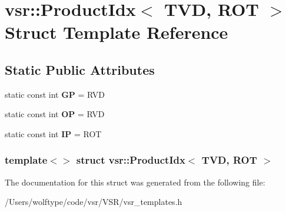 \hypertarget{structvsr_1_1_product_idx_3_01_t_v_d_00_01_r_o_t_01_4}{\section{vsr\-:\-:Product\-Idx$<$ T\-V\-D, R\-O\-T $>$ Struct Template Reference}
\label{structvsr_1_1_product_idx_3_01_t_v_d_00_01_r_o_t_01_4}
}
\subsection*{Static Public Attributes}
\begin{DoxyCompactItemize}
\item 
\hypertarget{structvsr_1_1_product_idx_3_01_t_v_d_00_01_r_o_t_01_4_a747c97039ccc3601b93871951b4f2016}{static const int {\bfseries G\-P} = R\-V\-D}\label{structvsr_1_1_product_idx_3_01_t_v_d_00_01_r_o_t_01_4_a747c97039ccc3601b93871951b4f2016}

\item 
\hypertarget{structvsr_1_1_product_idx_3_01_t_v_d_00_01_r_o_t_01_4_a77c0775794889dae97031d0b06afd0aa}{static const int {\bfseries O\-P} = R\-V\-D}\label{structvsr_1_1_product_idx_3_01_t_v_d_00_01_r_o_t_01_4_a77c0775794889dae97031d0b06afd0aa}

\item 
\hypertarget{structvsr_1_1_product_idx_3_01_t_v_d_00_01_r_o_t_01_4_aa93c15f2567e7874ea78c787628b162a}{static const int {\bfseries I\-P} = R\-O\-T}\label{structvsr_1_1_product_idx_3_01_t_v_d_00_01_r_o_t_01_4_aa93c15f2567e7874ea78c787628b162a}

\end{DoxyCompactItemize}
\subsubsection*{template$<$$>$ struct vsr\-::\-Product\-Idx$<$ T\-V\-D, R\-O\-T $>$}



The documentation for this struct was generated from the following file\-:\begin{DoxyCompactItemize}
\item 
/\-Users/wolftype/code/vsr/\-V\-S\-R/vsr\-\_\-templates.\-h\end{DoxyCompactItemize}
